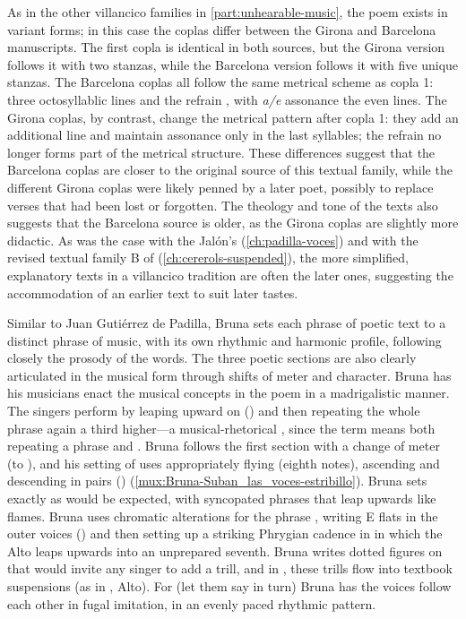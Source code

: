 As in the other villancico families in \cref{part:unhearable-music}, the poem
exists in variant forms; in this case the coplas differ between the Girona and
Barcelona manuscripts.
The first copla is identical in both sources, but the Girona version follows it
with two stanzas, while the Barcelona version follows it with five unique
stanzas.
The Barcelona coplas all follow the same metrical scheme as copla 1: three
octosyllablic lines and the refrain , with \emph{a/e} assonance
the even lines.
The Girona coplas, by contrast, change the metrical pattern after copla 1: they
add an additional line and maintain assonance only in the last syllables; the
 refrain no longer forms part of the metrical structure.
These differences suggest that the Barcelona coplas are closer to the original
source of this textual family, while the different Girona coplas were likely
penned by a later poet, possibly to replace verses that had been lost or
forgotten.
The theology and tone of the texts also suggests that the Barcelona source is
older, as the Girona coplas are slightly more didactic.
As was the case with the Jalón's 
(\cref{ch:padilla-voces}) and with the revised textual family B of
 (\cref{ch:cererols-suspended}), the more simplified,
explanatory texts in a villancico tradition are often the later ones, suggesting
the accommodation of an earlier text to suit later tastes.

Similar to Juan Gutiérrez de Padilla, Bruna sets each phrase of poetic text to a
distinct phrase of music, with its own rhythmic and harmonic profile, following
closely the prosody of the words.  
The three poetic sections are also clearly articulated in the musical form
through shifts of meter and character.
Bruna has his musicians enact the musical concepts in the poem in a
madrigalistic manner.  
The singers perform  by leaping upward on
 () and then repeating the whole phrase again a
third higher---a musical-rhetorical , since the term means both
repeating a phrase and .
Bruna follows the first section with a change of meter (to \meterC), and his
setting of  uses appropriately
flying  (eighth notes), ascending and descending in pairs
() (\cref{mux:Bruna-Suban_las_voces-estribillo}).
Bruna sets  exactly as would be expected, with
syncopated phrases that leap upwards like flames.
Bruna uses chromatic alterations for the phrase ,
writing E flats in the outer voices () and then setting up a
striking Phrygian cadence in  in which the Alto leaps upwards
into an unprepared seventh.  
Bruna writes dotted figures on  that would invite
any singer to add a trill, and in , these trills flow into
textbook suspensions (as in , Alto).
For  (let them say in turn) Bruna has the voices follow
each other in fugal imitation, in an evenly paced rhythmic pattern.

